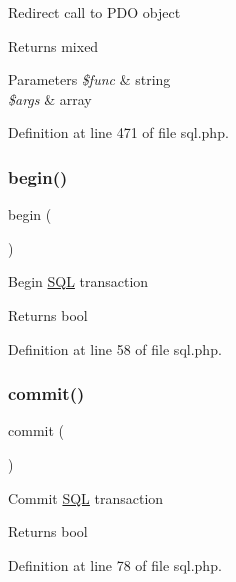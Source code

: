 Redirect call to P\+DO object \begin{DoxyReturn}{Returns}
mixed 
\end{DoxyReturn}

\begin{DoxyParams}{Parameters}
{\em \$func} & string \\
\hline
{\em \$args} & array \\
\hline
\end{DoxyParams}


Definition at line 471 of file sql.\+php.

\hypertarget{class_d_b_1_1_s_q_l_a3a9793666e688407121d76d3a7e4db5d}{}\label{class_d_b_1_1_s_q_l_a3a9793666e688407121d76d3a7e4db5d} 
\subsubsection{\texorpdfstring{begin()}{begin()}}
{\footnotesize\ttfamily begin (\begin{DoxyParamCaption}{ }\end{DoxyParamCaption})}

Begin \hyperlink{class_d_b_1_1_s_q_l}{S\+QL} transaction \begin{DoxyReturn}{Returns}
bool 
\end{DoxyReturn}


Definition at line 58 of file sql.\+php.

\hypertarget{class_d_b_1_1_s_q_l_af5674c27d4a92f6228565010eacbb9cb}{}\label{class_d_b_1_1_s_q_l_af5674c27d4a92f6228565010eacbb9cb} 
\subsubsection{\texorpdfstring{commit()}{commit()}}
{\footnotesize\ttfamily commit (\begin{DoxyParamCaption}{ }\end{DoxyParamCaption})}

Commit \hyperlink{class_d_b_1_1_s_q_l}{S\+QL} transaction \begin{DoxyReturn}{Returns}
bool 
\end{DoxyReturn}


Definition at line 78 of file sql.\+php.

\hypertarget{class_d_b_1_1_s_q_l_ac751e87b3d4c4bf2feb03bee8b092755}{}\label{class_d_b_1_1_s_q_l_ac751e87b3d4c4bf2feb03bee8b092755} 

